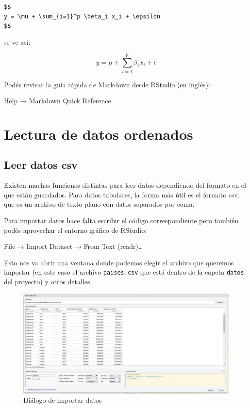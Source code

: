 \documentclass[
  openany]{book}
\begin{document}
\begin{verbatim}
$$
y = \mu + \sum_{i=1}^p \beta_i x_i + \epsilon
$$
\end{verbatim}

se ve así:

\[
y = \mu + \sum_{i=1}^p \beta_i x_i + \epsilon
\]

Podés revisar la guía rápida de Markdown desde RStudio (en inglés):

Help → Markdown Quick Reference

\hypertarget{lectura-de-datos-ordenados}{%
\chapter{Lectura de datos ordenados}\label{lectura-de-datos-ordenados}}

\hypertarget{leer-datos-csv}{%
\section{Leer datos csv}\label{leer-datos-csv}}

Existen muchas funciones distintas para leer datos dependiendo del formato en el que están guardados.
Para datos tabulares, la forma más útil es el formato csv, que es un archivo de texto plano con datos separados por coma.

Para importar datos hace falta escribir el código correspondiente pero también podés aprovechar el entorno gráfico de RStudio:

File → Import Dataset → From Text (readr)\ldots{}

Esto nos va abrir una ventana donde podemos elegir el archivo que queremos importar (en este caso el archivo \texttt{paises.csv} que está dentro de la capeta \texttt{datos} del proyecto) y otros detalles.

\begin{figure}
\centering
\includegraphics{img/importar-paises.png}
\caption{Diálogo de importar datos}
\end{figure}
\end{document}

